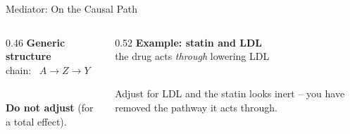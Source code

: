 \documentclass[aspectratio=169]{beamer}
\begin{document}
\begin{frame}{Mediator: On the Causal Path}
  \small
  \begin{columns}[T]
    \begin{column}{0.46\textwidth}
      \centering
      \textbf{Generic structure}\\ {\scriptsize chain: \ $A \to Z \to Y$}\\[0.9em]
      \\[0.9em]
      \textcolor{brick}{\textbf{Do not adjust}} (for a total effect).
    \end{column}
    \begin{column}{0.52\textwidth}
      \centering
      \textbf{Example: statin and LDL}\\ {\scriptsize the drug acts \emph{through} lowering LDL}\\[0.9em]
      \\[0.9em]
      {\scriptsize Adjust for LDL and the statin looks inert -- you have removed the pathway it acts through.}
    \end{column}
  \end{columns}
\end{frame}
\end{document}
